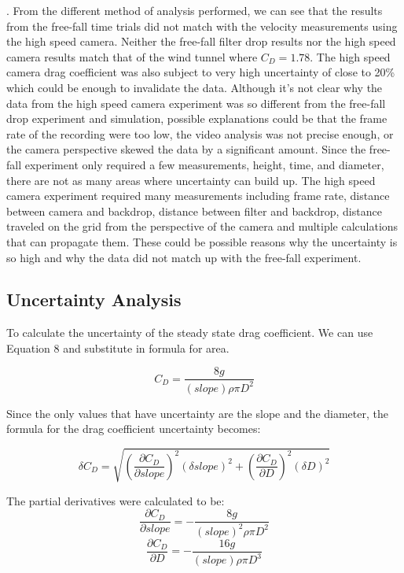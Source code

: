 \documentclass[12pt]{report}
\begin{document}
. From the different method of analysis performed, we can see that the results from the free-fall time trials did not match with the velocity measurements using the high speed camera. Neither the free-fall filter drop results nor the high speed camera results match that of the wind tunnel where $C_D = 1.78$. The high speed camera drag coefficient was also subject to very high uncertainty of close to 20\% which could be enough to invalidate the data. Although it's not clear why the data from the high speed camera experiment was so different from the free-fall drop experiment and simulation, possible explanations could be that the frame rate of the recording were too low, the video analysis was not precise enough, or the camera perspective skewed the data by a significant amount. Since the free-fall experiment only required a few measurements, height, time, and diameter, there are not as many areas where uncertainty can build up. The high speed camera experiment required many measurements including frame rate, distance between camera and backdrop, distance between filter and backdrop, distance traveled on the grid from the perspective of the camera and multiple calculations that can propagate them. These could be possible reasons why the uncertainty is so high and why the data did not match up with the free-fall experiment.

\subsection*{Uncertainty Analysis}

To calculate the uncertainty of the steady state drag coefficient. We can use Equation 8 and substitute in formula for area.

\begin{equation}
	C_D = \frac{8g}{(slope)\rho \pi D^2}
\end{equation}

\noindent Since the only values that have uncertainty are the slope and the diameter, the formula for the drag coefficient uncertainty becomes:

\begin{equation}
	\delta C_D = \sqrt{(\frac{\partial C_D}{\partial slope})^2(\delta slope)^2+(\frac{\partial C_D}{\partial D})^2(\delta D)^2}
\end{equation}

\noindent The partial derivatives were calculated to be:
\begin{equation}
	\frac{\partial C_D}{\partial slope} = -\frac{8g}{(slope)^2\rho \pi D^2}
\end{equation}
\begin{equation}
	\frac{\partial C_D}{\partial D} = -\frac{16g}{(slope)\rho \pi D^3}
\end{equation}
\end{document}
